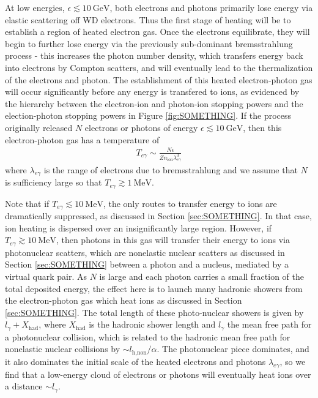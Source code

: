 \documentclass[twocolumn,showpacs,preprintnumbers,amsmath,amssymb,prd]{revtex4}
\newcommand{\GeV}{\text{GeV}}
\newcommand{\MeV}{\text{MeV}}
\begin{document}
At low energies, $\epsilon \lesssim 10~\GeV$, both electrons and photons primarily lose energy via elastic scattering off WD electrons.
Thus the first stage of heating will be to establish a region of heated electron gas.
Once the electrons equilibrate, they will begin to further lose energy via the previously sub-dominant bremsstrahlung process - this increases the photon number density, which transfers energy back into electrons by Compton scatters, and will eventually lead to the thermalization of the electrons and photon. 
The establishment of this heated electron-photon gas will occur significantly before any energy is transfered to ions, as evidenced by the hierarchy between the electron-ion and photon-ion stopping powers and the election-photon stopping powers in Figure \ref{fig:SOMETHING}.
If the process originally released $N$ electrons or photons of energy $\epsilon \lesssim 10~\GeV$, then this electron-photon gas has a temperature of 
\begin{align}
  T_{e\gamma} \sim \frac{N \epsilon}{Z n_\text{ion} \lambda_{e\gamma}^3}
\end{align}
where $\lambda_{e\gamma}$ is the range of electrons due to bremsstrahlung and we assume that $N$ is sufficiency large so that $T_{e\gamma} \gtrsim 1~\MeV$.  

Note that if $T_{e\gamma} \lesssim 10~\MeV$, the only routes to transfer energy to ions are dramatically suppressed, as discussed in Section \ref{sec:SOMETHING}. 
In that case, ion heating is dispersed over an insignificantly large region. 
However, if $T_{e\gamma} \gtrsim 10~\MeV$, then photons in this gas will transfer their energy to ions via photonuclear scatters, which are nonelastic nuclear scatters as discussed in Section \ref{sec:SOMETHING} between a photon and a nucleus, mediated by a virtual quark pair.   
As $N$ is large and each photon carries a small fraction of the total deposited energy, the effect here is to launch many hadronic showers from the electron-photon gas which heat ions as discussed in Section \ref{sec:SOMETHING}.  
The total length of these photo-nuclear showers is given by $l_\gamma + X_\text{had}$, where $X_\text{had}$ is the hadronic shower length and $l_\gamma$ the mean free path for a photonuclear collision, which is related to the hadronic mean free path for nonelastic nuclear collisions by $\sim l_\text{h,non}/\alpha$.
The photonuclear piece dominates, and it also dominates the initial scale of the heated electrons and photons $\lambda_{e\gamma}$, so we find that a low-energy cloud of electrons or photons will eventually heat ions over a distance $\sim l_\gamma$.
\end{document}
